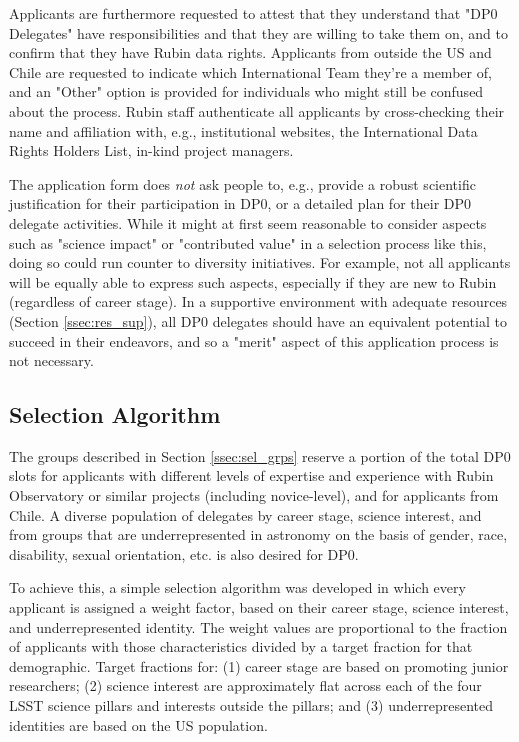 \documentclass[DM,lsstdraft,authoryear,toc]{lsstdoc}
\begin{document}
Applicants are furthermore requested to attest that they understand that "DP0 Delegates" have responsibilities and that they are willing to take them on, and to confirm that they have Rubin data rights. 
Applicants from outside the US and Chile are requested to indicate which International Team they're a member of, and an "Other" option is provided for individuals who might still be confused about the process.
Rubin staff authenticate all applicants by cross-checking their name and affiliation with, e.g., institutional websites, the International Data Rights Holders List, in-kind project managers.

The application form does {\it not} ask people to, e.g., provide a robust scientific justification for their participation in DP0, or a detailed plan for their DP0 delegate activities.
While it might at first seem reasonable to consider aspects such as "science impact" or "contributed value" in a selection process like this, doing so could run counter to diversity initiatives.
For example, not all applicants will be equally able to express such aspects, especially if they are new to Rubin (regardless of career stage).
In a supportive environment with adequate resources (Section \ref{ssec:res_sup}), all DP0 delegates should have an equivalent potential to succeed in their endeavors, and so a "merit" aspect of this application process is not necessary.


\subsection{Selection Algorithm}\label{ssec:sel_alg}

The groups described in Section \ref{ssec:sel_grps} reserve a portion of the total DP0 slots for applicants with different levels of expertise and experience with Rubin Observatory or similar projects (including novice-level), and for applicants from Chile. 
A diverse population of delegates by career stage, science interest, and from groups that are underrepresented in astronomy on the basis of gender, race, disability, sexual orientation, etc. is also desired for DP0. 

To achieve this, a simple selection algorithm was developed in which every applicant is assigned a weight factor, based on their career stage, science interest, and underrepresented identity.
The weight values are proportional to the fraction of applicants with those characteristics divided by a target fraction for that demographic. 
Target fractions for: (1) career stage are based on promoting junior researchers; (2) science interest are approximately flat across each of the four LSST science pillars and interests outside the pillars; and (3) underrepresented identities are based on the US population.
\end{document}
